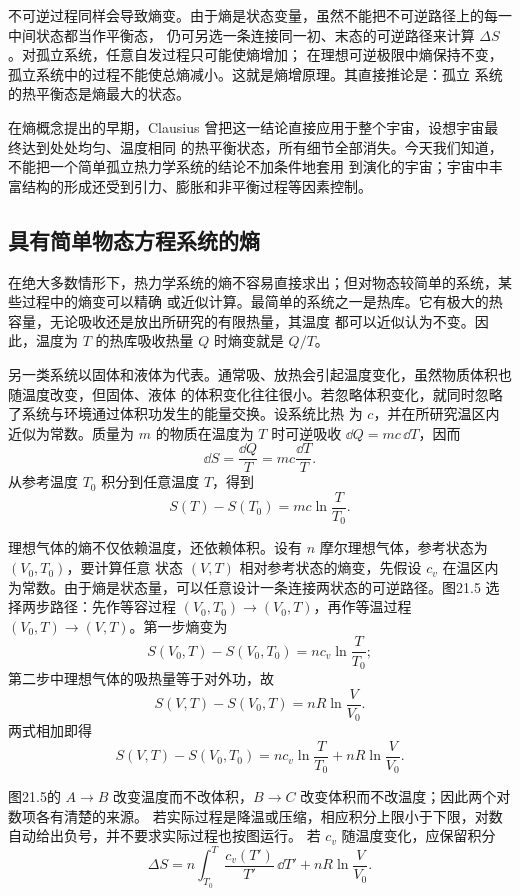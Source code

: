 不可逆过程同样会导致熵变。由于熵是状态变量，虽然不能把不可逆路径上的每一中间状态都当作平衡态，
仍可另选一条连接同一初、末态的可逆路径来计算 $\Delta S$。对孤立系统，任意自发过程只可能使熵增加；
在理想可逆极限中熵保持不变，孤立系统中的过程不能使总熵减小。这就是熵增原理。其直接推论是：孤立
系统的热平衡态是熵最大的状态。

在熵概念提出的早期，Clausius 曾把这一结论直接应用于整个宇宙，设想宇宙最终达到处处均匀、温度相同
的热平衡状态，所有细节全部消失。今天我们知道，不能把一个简单孤立热力学系统的结论不加条件地套用
到演化的宇宙；宇宙中丰富结构的形成还受到引力、膨胀和非平衡过程等因素控制。



\subsection*{具有简单物态方程系统的熵}

在绝大多数情形下，热力学系统的熵不容易直接求出；但对物态较简单的系统，某些过程中的熵变可以精确
或近似计算。最简单的系统之一是热库。它有极大的热容量，无论吸收还是放出所研究的有限热量，其温度
都可以近似认为不变。因此，温度为 $T$ 的热库吸收热量 $Q$ 时熵变就是 $Q/T$。

另一类系统以固体和液体为代表。通常吸、放热会引起温度变化，虽然物质体积也随温度改变，但固体、液体
的体积变化往往很小。若忽略体积变化，就同时忽略了系统与环境通过体积功发生的能量交换。设系统比热
为 $c$，并在所研究温区内近似为常数。质量为 $m$ 的物质在温度为 $T$ 时可逆吸收
$\dd Q=mc\,\dd T$，因而
\[
  \dd S=\frac{\dd Q}{T}=mc\frac{\dd T}{T}.
\]
从参考温度 $T_0$ 积分到任意温度 $T$，得到
\begin{equation}
  \boxed{S(T)-S(T_0)=mc\ln\frac{T}{T_0}}.
\end{equation}

理想气体的熵不仅依赖温度，还依赖体积。设有 $n$ 摩尔理想气体，参考状态为 $(V_0,T_0)$，要计算任意
状态 $(V,T)$ 相对参考状态的熵变，先假设 $c_v$ 在温区内为常数。由于熵是状态量，可以任意设计一条连接两状态的可逆路径。图21.5
选择两步路径：先作等容过程 $(V_0,T_0)\to(V_0,T)$，再作等温过程 $(V_0,T)\to(V,T)$。第一步熵变为
\[
  S(V_0,T)-S(V_0,T_0)=n c_v\ln\frac{T}{T_0};
\]
第二步中理想气体的吸热量等于对外功，故
\[
  S(V,T)-S(V_0,T)=nR\ln\frac{V}{V_0}.
\]
两式相加即得
\begin{equation}
  \boxed{S(V,T)-S(V_0,T_0)
  =n c_v\ln\frac{T}{T_0}+nR\ln\frac{V}{V_0}}.
\end{equation}

\entropyPathFigure
{}
图21.5的 $A\to B$ 改变温度而不改体积，$B\to C$ 改变体积而不改温度；因此两个对数项各有清楚的来源。
若实际过程是降温或压缩，相应积分上限小于下限，对数自动给出负号，并不要求实际过程也按图运行。
若 $c_v$ 随温度变化，应保留积分
\[
 \Delta S=n\int_{T_0}^{T}\frac{c_v(T')}{T'}\,\dd T'+nR\ln\frac{V}{V_0}.
\]

